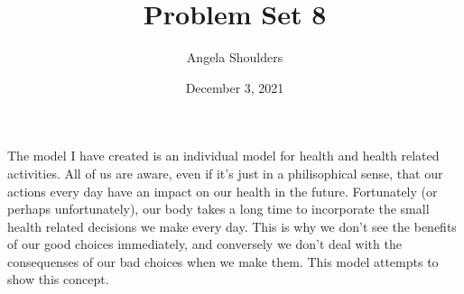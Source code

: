 \documentclass{article}[12pt]
\begin{document}
\title{Problem Set 8}
\author{Angela Shoulders}
\date{December 3, 2021}

\maketitle

The model I have created is an individual model for health and health related activities.  All of us are aware, even if it's just in a philisophical sense, that our actions every day have an impact on our health in the future.  Fortunately (or perhaps unfortunately), our body takes a long time to incorporate the small health related decisions we make every day.  This is why we don't see the benefits of our good choices immediately, and conversely we don't deal with the consequenses of our bad choices when we make them.  This model attempts to show this concept.
\end{document}
